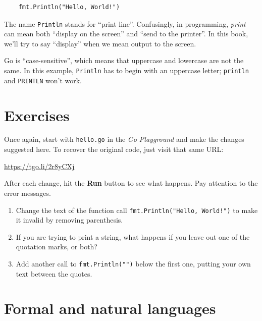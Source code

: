 \begin{lstlisting}
	fmt.Println("Hello, World!")
\end{lstlisting}

The name {\tt Println} stands for ``print line''. Confusingly, in programming,
{\em print} can mean both ``display on the screen'' and ``send to the
printer''. In this book, we'll try to say ``display'' when we mean output to
the screen.

Go is ``case-sensitive'', which means that uppercase
and lowercase are not the same. In this example, {\tt Println} has to begin
with an uppercase letter; {\tt println} and {\tt PRINTLN} won't work.

\section{Exercises}

\begin{exercise}

Once again, start with {\tt hello.go} in the {\it Go Playground} and make the
changes suggested here. To recover the original code, just visit that same
URL:

\url{https://tgo.li/2r8yCXj}

After each change, hit the {\bf Run} button to see what happens. Pay attention
to the error messages.

\begin{enumerate}

\item Change the text of the function call {\tt fmt.Println("Hello, World!")}
to make it invalid by removing parenthesis.

\item If you are trying to print a string, what happens if you leave out one
of the quotation marks, or both?

\item Add another call to {\tt fmt.Println("")} below the first one, putting
your own text between the quotes.


\end{enumerate}

\end{exercise}



\section{Formal and natural languages}

